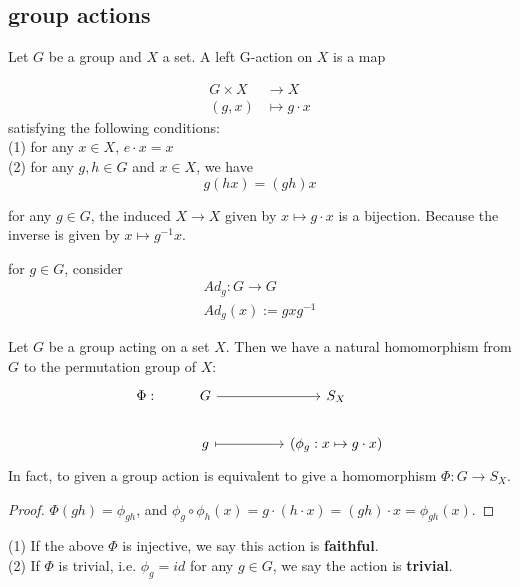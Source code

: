 \documentclass[11pt,fleqn]{book} %
\begin{document}
\begin{CJK}{UTF8}{gkai}
\subsection{group actions}
\begin{definition}
	Let $G$ be a group and $X$ a set. A left G-action on $X$ is a map 
	
		\begin{align*}
			G \times X & \to X \\
			  (g,x) & \mapsto g  \cdot x 
	   \end{align*}
	satisfying the following conditions: \\
	(1) for any $x \in X$, $e \cdot x = x$ \\
	(2) for any $g,h \in G$ and $x \in X$, we have 
	\[g(hx) = (gh)x\]
\end{definition}

\begin{remark}
	for any $g\in G$, the induced $X \to X$ given by $x \mapsto g\cdot x$ is a bijection. Because the inverse is given by $x \mapsto g^{-1} x$.
\end{remark}

\begin{definition}
	 for $g\in G$, consider 
	\begin{align*}
		Ad_g: G \to G \\
		Ad_g(x) := gxg^{-1}
	\end{align*}
\end{definition}

\begin{proposition}
	Let $G$ be a group acting on a set $X$. Then we have a natural homomorphism from $G$ to the permutation group of $X$:
	\[\begin{tikzcd}
		{\Phi:} & G && {S_X} \\
		& g && {(\phi_g:x\mapsto g\cdot x)}
		\arrow[from=1-2, to=1-4]
		\arrow[maps to, from=2-2, to=2-4]
	\end{tikzcd}\]
	In fact, to given a group action is equivalent to give a homomorphism $\Phi:G\to S_X$.
\end{proposition}
\begin{proof}
	$\Phi(gh) = \phi_{gh}$, and $\phi_g \circ \phi_h (x) = g\cdot(h\cdot x) = (gh)\cdot x = \phi_{gh}(x)$.
\end{proof}

\begin{definition}
	(1) If the above $\Phi$ is injective, we say this action is {\bf faithful}. \\
	(2) If $\Phi$ is trivial, i.e. $\phi_g = id$ for any $g \in G$, we say the action is {\bf trivial}.
\end{definition}


\end{CJK}
\end{document}
